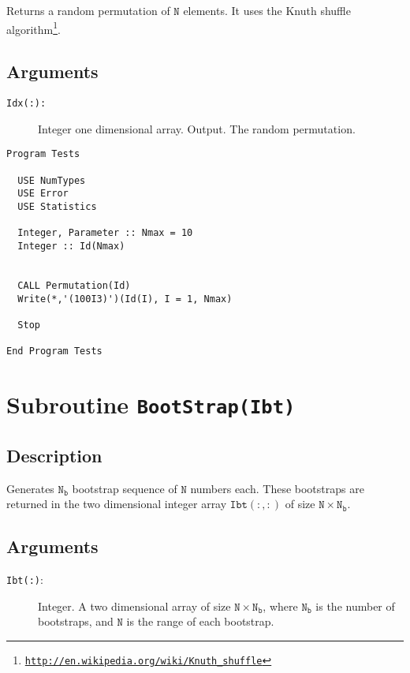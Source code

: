 Returns a random permutation of $\mathtt{N}$ elements. It uses the
Knuth shuffle algorithm\footnote{\href{http://en.wikipedia.org/wiki/Knuth_shuffle}{\texttt{http://en.wikipedia.org/wiki/Knuth\_shuffle}}}.

\subsection{Arguments}

\begin{description}
\item[\texttt{Idx(:): }] Integer  one dimensional array. Output. The
  random permutation.
\end{description}

\begin{lstlisting}[emph=Permutation,
                   emphstyle=\color{blue},
                   frame=trBL,
                   caption=Obtaining a permutation.,
                   label=Permutation]
Program Tests

  USE NumTypes
  USE Error
  USE Statistics

  Integer, Parameter :: Nmax = 10
  Integer :: Id(Nmax)


  CALL Permutation(Id)
  Write(*,'(100I3)')(Id(I), I = 1, Nmax)

  Stop

End Program Tests
\end{lstlisting}


\section{Subroutine \texttt{BootStrap(Ibt)}}

\subsection{Description}

Generates $\mathtt{N_b}$ bootstrap sequence of $\mathtt{N}$ numbers
each. These bootstraps are returned in the two dimensional integer
array $\mathtt{Ibt(:,:)}$ of size $\mathtt{N\times N_b}$.

\subsection{Arguments}

\begin{description}
\item[\texttt{Ibt(:)}:] Integer. A two dimensional array of size
  $\mathtt{N\times N_b}$, where $\mathtt{N_b}$ is the number of
  bootstraps, and $\mathtt{N}$ is the range of each bootstrap.
\end{description}

